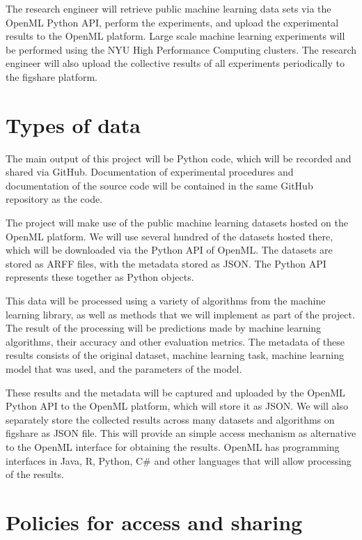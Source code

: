 The research engineer will retrieve public machine learning data sets via the
OpenML Python API, perform the experiments, and upload the experimental results
to the OpenML platform. Large scale machine learning experiments will be
performed using the NYU High
Performance Computing clusters. The research engineer will also upload the
collective results of all experiments periodically to the figshare platform.

\section{Types of data}

The main output of this project will be Python code, which will be recorded and
shared via GitHub. Documentation of experimental procedures and documentation of the
source code will be contained in the same GitHub repository as the code.

The project will make use of the public machine learning datasets hosted on the
OpenML platform. We will use several hundred of the datasets hosted there, which will
be downloaded via the Python API of OpenML\@. The datasets are stored as ARFF
files, with the metadata stored as JSON\@. The Python API represents these
together as Python objects.

This data will be processed using a variety of algorithms from the \sklearn{}
machine learning library, as well as methods that we will implement as part of
the project. The result of the processing will be predictions made by machine
learning algorithms, their accuracy and other evaluation metrics. The
metadata of these results consists of the original dataset, machine learning
task, machine learning model that was used, and the parameters of the model.

These results and the metadata will be captured and uploaded by the OpenML
Python API to the OpenML platform, which will store it as JSON\@. We will also
separately store the collected results across many datasets and algorithms on
figshare as JSON file. This will provide an  simple access mechanism as
alternative to the OpenML interface for obtaining the results. OpenML has
programming interfaces in Java, R, Python, C\# and other languages that will
allow processing of the results.


\section{Policies for access and sharing}

